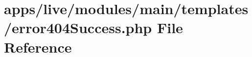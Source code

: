 \hypertarget{live_2modules_2main_2templates_2error404_success_8php}{\section{apps/live/modules/main/templates/error404\-Success.php File Reference}
\label{live_2modules_2main_2templates_2error404_success_8php}
}
